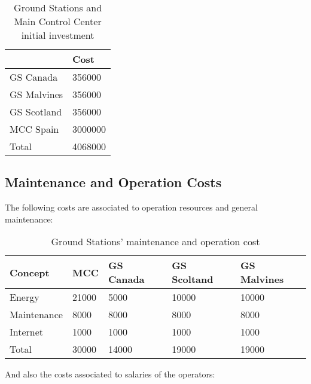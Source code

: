 \begin{table}[h]
\begin{center}
\begin{tabular}{ | l | l | }
\toprule
\hline
\rowcolor[gray]{0.75}
	 & Cost \\ \hline
	GS Canada & 356000 \\ \hline
	GS Malvines & 356000 \\ \hline
	GS Scotland & 356000 \\ \hline
	MCC Spain & 3000000 \\ \hline
	\rowcolor[gray]{0.65}
	Total & 4068000 \\ \hline
	\bottomrule

\end{tabular}
\caption{Ground Stations and Main Control Center initial investment}
\end{center}
\end{table}




\subsection{Maintenance and Operation Costs}
The following costs are associated to operation resources and general maintenance:

\begin{table}[h]
\begin{center}
\begin{tabular}{ | l | l | l | l | l | }
\toprule
\hline
\rowcolor[gray]{0.75}
	Concept & MCC & GS Canada & GS Scoltand & GS Malvines \\ \hline
	Energy & 21000 & 5000 & 10000 & 10000 \\ \hline
	Maintenance & 8000 & 8000 & 8000 & 8000 \\ \hline
	Internet & 1000 & 1000 & 1000 & 1000 \\ \hline
	\rowcolor[gray]{0.65}
	Total & 30000 & 14000 & 19000 & 19000 \\ \hline
	\bottomrule
\end{tabular}
\caption{Ground Stations' maintenance and operation cost}
\end{center}
\end{table}

And also the costs associated to salaries of the operators:

